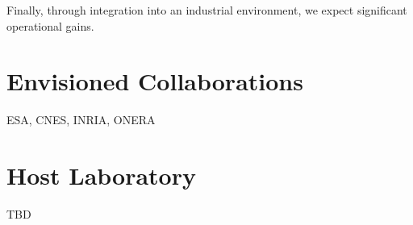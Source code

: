 \documentclass[12pt]{article}
\begin{document}
	Finally, through integration into an industrial environment, we expect significant operational gains.
	
	\nocite{*}
	
	\printbibliography[title=Indicative Bibliography]
	
	\section*{Envisioned Collaborations}
	
	ESA, CNES, INRIA, ONERA
	
	\section*{Host Laboratory}
	
	TBD
	
\end{document}
